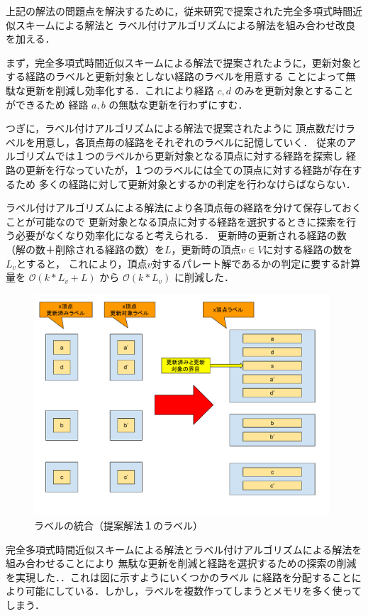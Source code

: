 \documentclass[12pt]{optlab-bachelor}
\begin{document}
上記の解法の問題点を解決するために，従来研究で提案された完全多項式時間近似スキームによる解法と
ラベル付けアルゴリズムによる解法を組み合わせ改良を加える．

まず，完全多項式時間近似スキームによる解法で提案されたように，更新対象とする経路のラベルと更新対象としない経路のラベルを用意する
ことによって無駄な更新を削減し効率化する．これにより経路 $c,d$ のみを更新対象とすることができるため
経路 $a,b$ の無駄な更新を行わずにすむ．

つぎに，ラベル付けアルゴリズムによる解法で提案されたように
頂点数だけラベルを用意し，各頂点毎の経路をそれぞれのラベルに記憶していく．
従来のアルゴリズムでは１つのラベルから更新対象となる頂点に対する経路を探索し
経路の更新を行なっていたが，１つのラベルには全ての頂点に対する経路が存在するため
多くの経路に対して更新対象とするかの判定を行わなけらばならない．

ラベル付けアルゴリズムによる解法により各頂点毎の経路を分けて保存しておくことが可能なので
更新対象となる頂点に対する経路を選択するときに探索を行う必要がなくなり効率化になると考えられる．
更新時の更新される経路の数（解の数＋削除される経路の数）を$L$，更新時の頂点$v\in V$に対する経路の数を$L_v$とすると，
これにより，頂点$v$対するパレート解であるかの判定に要する計算量を $\mathcal{O}(k*L_v+L)$ から $\mathcal{O}(k*L_v)$ に削減した．


\begin{figure}[htbp]
  \centering
  \caption{ラベルの統合（提案解法１のラベル）}
  \includegraphics[width=11.0cm]{fig/fig4.pdf}
\end{figure}

完全多項式時間近似スキームによる解法とラベル付けアルゴリズムによる解法を組み合わせることにより
無駄な更新を削減と経路を選択するための探索の削減を実現した．．これは図に示すようにいくつかのラベル
に経路を分配することにより可能にしている．しかし，ラベルを複数作ってしまうとメモリを多く使ってしまう．
\end{document}
